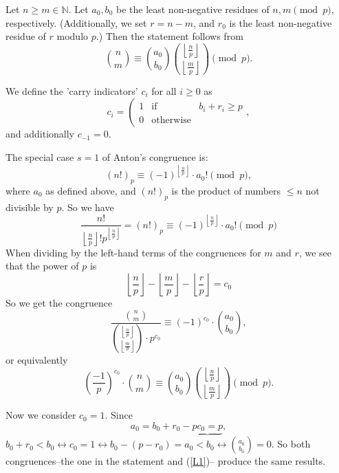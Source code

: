 \documentclass[12pt]{article}
\newcommand{\pfac}[1]{\left(#1!\right)_p}
\begin{document}
Let $n \ge m \in \mathbb{N}$. Let $a_0, b_0$ be the least non-negative residues
of $n,m \pmod{p}$, respectively. (Additionally, we set $r=n-m$, and $r_0$ is the
least non-negative residue of $r$ modulo $p$.) Then the statement follows from
\begin{displaymath}
\binom{n}{m} \equiv \binom{a_0}{b_0}\binom{\left\lfloor
\frac{n}{p}\right\rfloor}{\left\lfloor\frac{m}{p}\right\rfloor} \pmod{p}.
\end{displaymath}

We define the 'carry indicators' $c_i$ for all $i \ge 0$ as
\begin{displaymath}
c_i =\left(
\begin{array}{lll}
1 & \mbox{if}
 & b_i +r_i \ge p \\
0 & \mbox{otherwise}
\end{array}\right.,
\end{displaymath}
and additionally $c_{-1} =0$.

The special case $s=1$ of Anton's congruence is:
\begin{equation}
\pfac{n} \equiv \left(- 1\right)^{\left\lfloor \frac{n}{p}\right\rfloor}\cdot
a_0! \pmod{p},
\end{equation}
where $a_0$ as defined above, and $\pfac{n}$ is the product of numbers $\le n$
not divisible by $p$.
So we have
\begin{displaymath}
\frac{n!}{\left\lfloor
\frac{n}{p}\right\rfloor!p^{\left\lfloor\frac{n}{p}\right\rfloor}} =\pfac{n}
\equiv (-1)^{\left\lfloor\frac{n}{p}\right\rfloor}\cdot a_0! \pmod{p}
\end{displaymath}
When dividing  by the left-hand terms of the congruences for $m$ and $r$, we see
that the power of $p$ is
\begin{displaymath}
\left\lfloor\frac{n}{p}\right\rfloor -\left\lfloor\frac{m}{p}\right\rfloor
-\left\lfloor\frac{r}{p}\right\rfloor =c_0
\end{displaymath}
So we get the congruence
\begin{displaymath}
\frac{\binom{n}{m}}{\binom{\left\lfloor\frac{n}{p}\right\rfloor}{\left\lfloor\frac{m}{p}\right\rfloor}\cdot
p^{c_0}} \equiv (-1)^{c_0}\cdot \binom{a_0}{b_0},
\end{displaymath}
or equivalently
\begin{equation}
\label{L1}
\left(\frac{-1}{p}\right)^{c_0}\cdot \binom{n}{m} \equiv
\binom{a_0}{b_0}\binom{\left\lfloor\frac{n}{p}\right\rfloor}{\left\lfloor\frac{m}{p}\right\rfloor} \pmod{p}.
\end{equation}

Now we consider $c_0 =1$. Since
\[a_0 =b_0 +r_0 -\underbrace{pc_0=p},\]
$b_0 +r_0 < b_0 \leftrightarrow c_0 =1 \leftrightarrow b_0 -(p -r_0) =a_0 <b_0
\leftrightarrow \binom{a_0}{b_0}=0 $. So both congruences--the one in the
statement and (\ref{L1})-- produce the same results.
\end{document}
